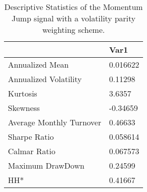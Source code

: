 \begin{table}[H]
\centering
\begin{tabular}{ll}
\hline& Var1 \\ 
\hline 
Annualized Mean & 0.016622 \\ 
Annualized Volatility & 0.11298 \\ 
Kurtosis & 3.6357 \\ 
Skewness & -0.34659 \\ 
Average Monthly Turnover & 0.46633 \\ 
Sharpe Ratio & 0.058614 \\ 
Calmar Ratio & 0.067573 \\ 
Maximum DrawDown & 0.24599 \\ 
HH* & 0.41667 \\ 
\hline
\end{tabular}
\caption{Descriptive Statistics of the Momentum Jump signal with a volatility parity weighting scheme.}
\label{MOMJUMPVP}
\end{table}